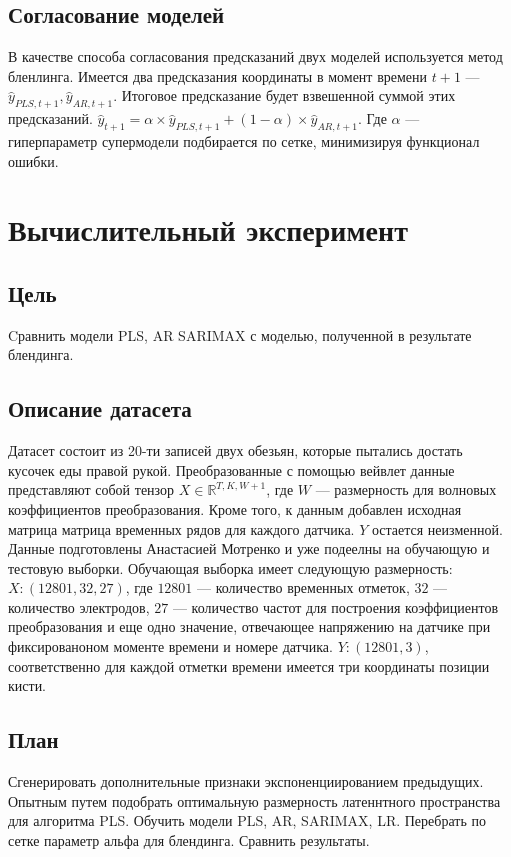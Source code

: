 \documentclass{article}
\begin{document}
\subsection{Согласование моделей}
В качестве способа согласования предсказаний двух моделей используется метод бленлинга. Имеется два предсказания координаты в момент времени $t+1$ --- $\hat{y}_{PLS, t+1}, \hat{y}_{AR, t+1}$. Итоговое предсказание будет взвешенной суммой этих предсказаний. $\hat{y}_{t+1} = \alpha \times \hat{y}_{PLS, t+1} + (1 - \alpha) \times \hat{y}_{AR, t+1}$. Где $\alpha$ --- гиперпараметр супермодели подбирается по сетке, минимизируя функционал ошибки.
 

\section{Вычислительный эксперимент}
\subsection{Цель}
Cравнить модели PLS, AR SARIMAX с моделью, полученной в результате блендинга. 
\subsection{Описание датасета}
Датасет состоит из 20-ти записей двух обезьян, которые пытались достать кусочек еды правой рукой. Преобразованные с помощью вейвлет данные представляют собой тензор $X \in \mathds{R}^{T, K, W+1}$, где $W$ --- размерность для волновых коэффициентов преобразования. Кроме того, к данным добавлен исходная матрица матрица временных рядов для каждого датчика. $Y$ остается неизменной. Данные подготовлены Анастасией Мотренко и уже подеелны на обучающую и тестовую выборки. Обучающая выборка имеет следующую размерность: $X:(12801, 32, 27)$, где $12801$ --- количество временных отметок, $32$ --- количество электродов, $27$ --- количество частот для построения коэффициентов преобразования и еще одно значение, отвечающее напряжению на датчике при фиксированоном моменте времени и номере датчика. $Y:(12801, 3)$, соответственно для каждой отметки времени имеется три координаты позиции кисти. \par
\subsection{План}
Сгенерировать дополнительные признаки экспоненциированием предыдущих. Опытным путем подобрать оптимальную размерность латеннтного пространства для алгоритма PLS. Обучить модели PLS, AR, SARIMAX, LR. Перебрать по сетке параметр альфа для блендинга. Сравнить результаты.
\end{document}
